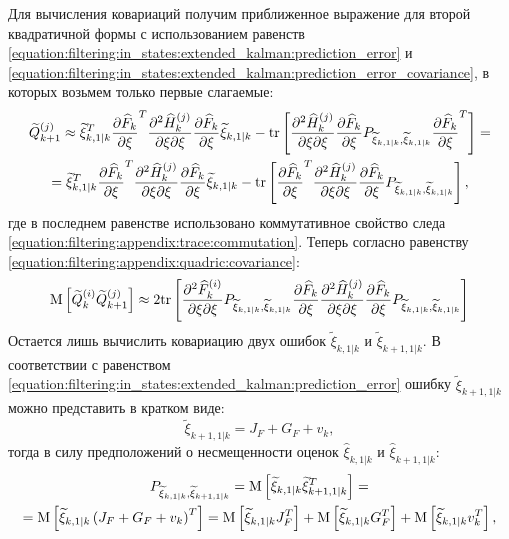 Для вычисления ковариаций получим приближенное выражение для второй квадратичной формы с использованием равенств
\eqref{equation:filtering:in_states:extended_kalman:prediction_error} и \eqref{equation:filtering:in_states:extended_kalman:prediction_error_covariance}, в которых
возьмем только первые слагаемые:
\begin{multline*}
    \widetilde{Q}_{k+1}^{(j)}
        \approx \widetilde{\xi}_{k,1|k}^T \frac{\partial \widehat{F}_k}{\partial \xi}^T \frac{\partial^2 \widehat{H}_k^{(j)}}{{\partial \xi}{\partial \xi}} \frac{\partial \widehat{F}_k}{\partial \xi} \widetilde{\xi}_{k,1|k} - \mathrm{tr} \left [ \frac{\partial^2 \widehat{H}_k^{(j)}}{{\partial \xi}{\partial \xi}} \frac{\partial \widehat{F}_k}{\partial \xi} P_{\widetilde{\xi}_{k,1|k}, \widetilde{\xi}_{k,1|k}} \frac{\partial \widehat{F}_k}{\partial \xi}^T \right ] = \\
    = \widetilde{\xi}_{k,1|k}^T \frac{\partial \widehat{F}_k}{\partial \xi}^T \frac{\partial^2 \widehat{H}_k^{(j)}}{{\partial \xi}{\partial \xi}} \frac{\partial \widehat{F}_k}{\partial \xi} \widetilde{\xi}_{k,1|k} - \mathrm{tr} \left [ \frac{\partial \widehat{F}_k}{\partial \xi}^T \frac{\partial^2 \widehat{H}_k^{(j)}}{{\partial \xi}{\partial \xi}} \frac{\partial \widehat{F}_k}{\partial \xi} P_{\widetilde{\xi}_{k,1|k}, \widetilde{\xi}_{k,1|k}} \right ] ,
\end{multline*}
где в последнем равенстве использовано коммутативное свойство следа \eqref{equation:filtering:appendix:trace:commutation}. Теперь согласно равенству
\eqref{equation:filtering:appendix:quadric:covariance}:
$$
    \mathrm{M} \left [ \widetilde{Q}_{k}^{(i)} \widetilde{Q}_{k+1}^{(j)} \right ]
        \approx 2 \mathrm{tr} \left [ \frac{\partial^2 \widehat{F}_k^{(i)}}{{\partial \xi}{\partial \xi}} P_{\widetilde{\xi}_{k,1|k},\widetilde{\xi}_{k,1|k}} \frac{\partial \widehat{F}_k}{\partial \xi} \frac{\partial^2 \widehat{H}_k^{(j)}}{{\partial \xi}{\partial \xi}} \frac{\partial \widehat{F}_k}{\partial \xi} P_{\widetilde{\xi}_{k,1|k},\widetilde{\xi}_{k,1|k}} \right ]
$$
Остается лишь вычислить ковариацию двух ошибок $\widetilde{\xi}_{k,1|k}$ и $\widetilde{\xi}_{k+1,1|k}$. В соответствии с равенством
\eqref{equation:filtering:in_states:extended_kalman:prediction_error} ошибку $\widetilde{\xi}_{k+1,1|k}$ можно представить в кратком виде:
$$
    \widetilde{\xi}_{k+1,1|k} = J_F + G_F + v_k ,
$$
тогда в силу предположений о несмещенности оценок $\widehat{\xi}_{k,1|k}$ и $\widehat{\xi}_{k+1,1|k}$:
\begin{multline*}
    P_{\widetilde{\xi}_{k,1|k}, \widetilde{\xi}_{k+1,1|k}}
        = \mathrm{M} \left [ \widetilde{\xi}_{k,1|k} \widetilde{\xi}_{k+1,1|k}^T \right ] = \\
    = \mathrm{M} \left [ \widetilde{\xi}_{k,1|k} \left ( J_F + G_F + v_k \right )^T \right ]
        = \mathrm{M} \left [ \widetilde{\xi}_{k,1|k} J_F^T \right ] + \mathrm{M} \left [ \widetilde{\xi}_{k,1|k} G_F^T \right ] + \mathrm{M} \left [ \widetilde{\xi}_{k,1|k} v_k^T \right ] ,
\end{multline*}
